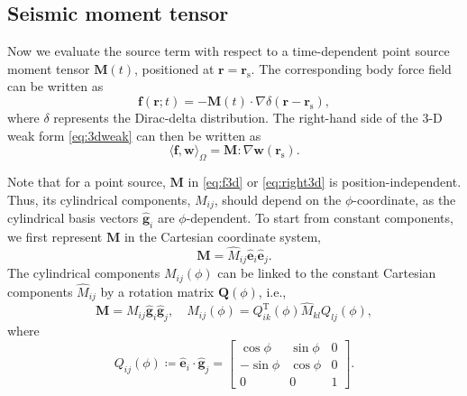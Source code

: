 \documentclass[extra,referee]{gji}
\begin{document}
\subsection{Seismic moment tensor}
\label{sec:moment}
Now we evaluate the source term with respect to  
a time-dependent point source moment tensor $\mathbf{M}\left(t\right)$, 
positioned at $\mathbf{r}=\mathbf{r}_\text{s}$.  
The corresponding body force field can be written as
\begin{equation}
  \mathbf{f}\left(\mathbf{r};t\right)=
  -\mathbf{M}\left(t\right)\cdot\nabla\delta\left(\mathbf{r}-
  \mathbf{r}_{\text{s}}\right),
  \label{eq:f3d}
\end{equation}
where $\delta$ represents the Dirac-delta distribution. 
The right-hand side of the 3-D weak form \eqref{eq:3dweak} 
can then be written as
\begin{equation}
  \langle \mathbf{f},\mathbf{w}\rangle_{\Omega}=
  \mathbf{M}:  \nabla\mathbf{w}\left(\mathbf{r}_{\text{s}}\right).
  \label{eq:right3d}
\end{equation}

Note that for a point source, $\mathbf{M}$ in \eqref{eq:f3d} or 
\eqref{eq:right3d} is position-independent. 
Thus, its cylindrical components, $M_{ij}$, should depend on the $\phi$-coordinate, 
as the cylindrical basis vectors $\hat{\mathbf{g}}_{i}$ are $\phi$-dependent. 
To start from constant components, we first
represent $\mathbf{M}$ in the Cartesian coordinate system,
\begin{equation}
  \mathbf{M}=\hat{M}_{ij}\hat{\mathbf{e}}_{i}\hat{\mathbf{e}}_{j}.
\end{equation}
The cylindrical components $M_{ij}\left(\phi\right)$ can be linked to the constant 
Cartesian components $\hat{M}_{ij}$ 
by a rotation matrix $\mathbf{Q}\left(\phi\right)$, i.e.,
\begin{equation}
  \mathbf{M}=M_{ij}\hat{\mathbf{g}}_{i}\hat{\mathbf{g}}_{j},\quad 
  M_{ij}\left(\phi\right)=Q^\text{T}_{ik}\left(\phi\right)\hat{M}_{kl}Q_{lj}\left(\phi\right), 
  \label{eq:mij}
\end{equation}
where
\begin{equation}
  Q_{ij}\left(\phi\right) \coloneqq \hat{\mathbf{e}}_{i}\cdot\hat{\mathbf{g}}_{j} =
  \begin{bmatrix}
    \cos\phi & \sin\phi & 0 \\
    -\sin\phi & \cos\phi & 0 \\
    0 & 0 & 1
  \end{bmatrix}.
\end{equation}
\end{document}
